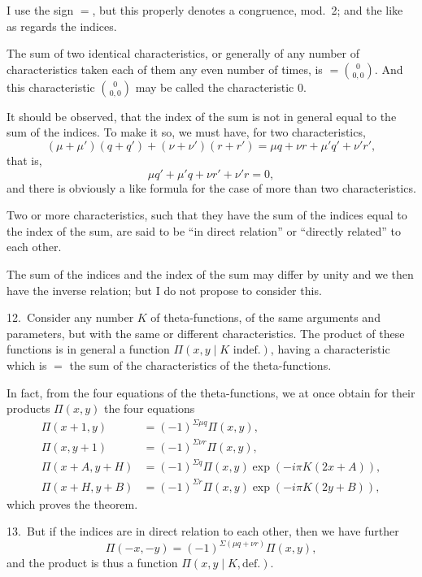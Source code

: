 \documentclass[11pt,a4paper]{article}
\theoremstyle{definition}
\begin{document}
I use the sign $=$, but this properly denotes a congruence, mod.~2; and the like as regards the indices.

The sum of two identical characteristics, or generally of any number of characteristics taken each of them any even number of times, is $= \binom{0}{0, 0}$. And this characteristic $\binom{0}{0, 0}$ may be called the characteristic $0$.

It should be observed, that the index of the sum is not in general equal to the sum of the indices. To make it so, we must have, for two characteristics,
\[
(\mu + \mu')(q + q') + (\nu + \nu')(r + r') = \mu q + \nu r + \mu' q' + \nu' r',
\]
that is,
\[
\mu q' + \mu' q + \nu r' + \nu' r = 0,
\]
and there is obviously a like formula for the case of more than two characteristics.

Two or more characteristics, such that they have the sum of the indices equal to the index of the sum, are said to be ``in direct relation'' or ``directly related'' to each other.

The sum of the indices and the index of the sum may differ by unity and we then have the inverse relation; but I do not propose to consider this.

\medskip

12.\ Consider any number $K$ of theta-functions, of the same arguments and parameters, but with the same or different characteristics. The product of these functions is in general a function $\Pi(x, y \mid K \text{ indef.})$, having a characteristic which is $=$ the sum of the characteristics of the theta-functions.

In fact, from the four equations of the theta-functions, we at once obtain for their products $\Pi(x, y)$ the four equations
\begin{align*}
\Pi(x+1, y) &= (-1)^{\Sigma\mu q}\Pi(x, y),\\
\Pi(x, y+1) &= (-1)^{\Sigma\nu r}\Pi(x, y),\\
\Pi(x+A, y+H) &= (-1)^{\Sigma q}\Pi(x, y)\exp(-i\pi K(2x + A)),\\
\Pi(x+H, y+B) &= (-1)^{\Sigma r}\Pi(x, y)\exp(-i\pi K(2y + B)),
\end{align*}
which proves the theorem.

\medskip

13.\ But if the indices are in direct relation to each other, then we have further
\[
\Pi(-x, -y) = (-1)^{\Sigma(\mu q + \nu r)}\Pi(x, y),
\]
and the product is thus a function $\Pi(x, y \mid K, \text{def.})$.
\end{document}

